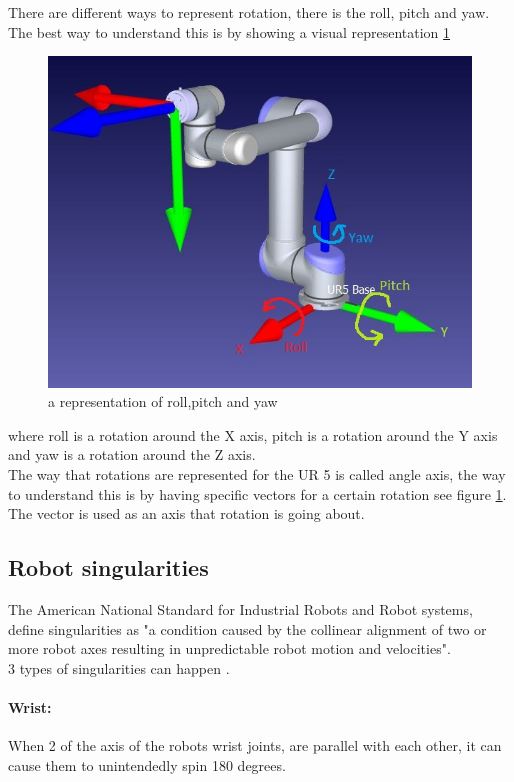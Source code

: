 There are different ways to represent rotation, there is the roll, pitch and yaw. The best way to understand this is by showing a visual representation \ref{fig:rpy-rep}
\begin{figure}[H]
    \centering
    \includegraphics[width=\textwidth]{Design/UR5RPY.JPG}
    \caption{a representation of roll,pitch and yaw\cite{CHRobotics}}
    \label{fig:rpy-rep}
\end{figure}

where roll is a rotation around the X axis, pitch is a rotation around the Y axis and yaw is a rotation around the Z axis\cite{JohnC}.\\
The way that rotations are represented for the UR 5 is called angle axis, the way to understand this is by having specific vectors for a certain rotation see figure \ref{fig:rpy-rep}. The vector is used as an axis that rotation is going about\cite{JohnC}.

\subsection{Robot singularities}
The American National Standard for Industrial Robots and Robot systems, define singularities as "a condition caused by the collinear alignment of two or more robot axes resulting in unpredictable robot motion and velocities".\\
3 types of singularities can happen \cite{3Sing}.

\paragraph{Wrist:} When 2 of the axis of the robots wrist joints, are parallel with each other, it can cause them to unintendedly spin 180 degrees.
